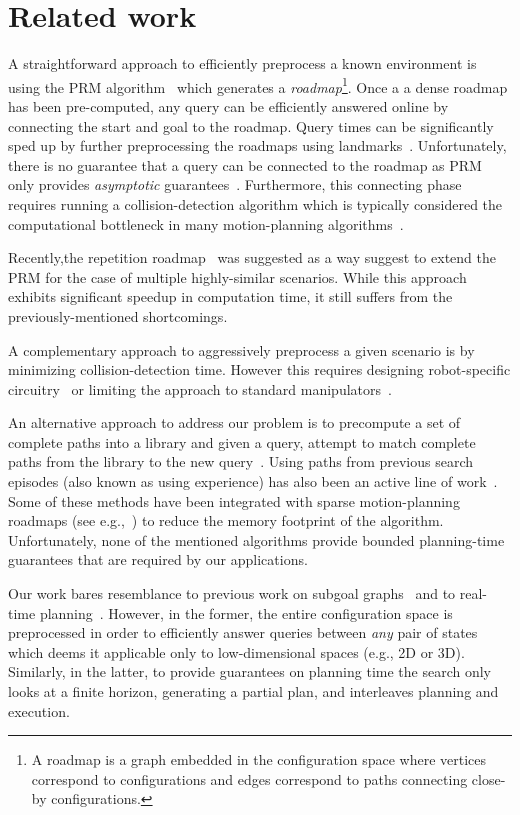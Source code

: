 \documentclass[letterpaper]{article} %
\begin{document}
\section{Related work}
\label{sec:rel}
A straightforward approach to efficiently preprocess a known environment is using the \textsf{PRM} algorithm~\cite{kavraki1996probabilistic} which generates a \emph{roadmap}\footnote{A roadmap is a graph embedded in the configuration space where vertices correspond to configurations and edges correspond to paths connecting close-by configurations.}.
Once a a dense roadmap has been pre-computed, any query can be efficiently answered online by connecting the start and goal to the roadmap. 
Query times can be significantly sped up by further preprocessing the roadmaps using landmarks~\cite{paden2017landmark}.
Unfortunately, there is no guarantee that a query can be connected to the roadmap as \textsf{PRM} only provides \emph{asymptotic} guarantees~\cite{KKL98}.
Furthermore, this connecting phase requires running a collision-detection algorithm which is typically considered the computational bottleneck in many motion-planning algorithms~\cite{L06}.

Recently,the repetition roadmap~\cite{LA18} was suggested as a way suggest  to extend the \textsf{PRM} for the case of multiple highly-similar scenarios.
While this approach exhibits significant speedup in computation time, it still suffers from the previously-mentioned shortcomings.

A complementary approach to aggressively preprocess a given scenario is by minimizing collision-detection time.
However this requires designing robot-specific
circuitry~\cite{MFQSK16}
or limiting the approach to standard manipulators~\cite{YMILV18}.

An alternative approach to address our problem is to precompute a set of complete paths into a library and given a query, attempt to match complete paths from the library to the new query~\cite{berenson2012robot,jetchev2013fast}.
Using paths from previous search episodes (also known as using experience) has also been an active line of work~\cite{PCCL12,PDCL13,BAG12,CSMOC15}.
Some of these methods have been integrated with sparse motion-planning roadmaps (see e.g.,~\cite{SSAH14,DB14}) to reduce the memory footprint of the algorithm.
Unfortunately, none of the mentioned algorithms provide bounded planning-time guarantees that are required by our applications.

Our work bares resemblance to previous work on 
subgoal graphs~\cite{UK17,UK18} and to real-time planning~\cite{KL06,KS09,K90}.
However, in the former, the entire configuration space is preprocessed in order to efficiently answer queries between \emph{any} pair of states which deems it applicable only to low-dimensional spaces (e.g., 2D or 3D).
Similarly, in the latter, to provide guarantees on planning time the search only looks at a finite horizon, generating a partial plan,  and interleaves planning and execution.
\end{document}
